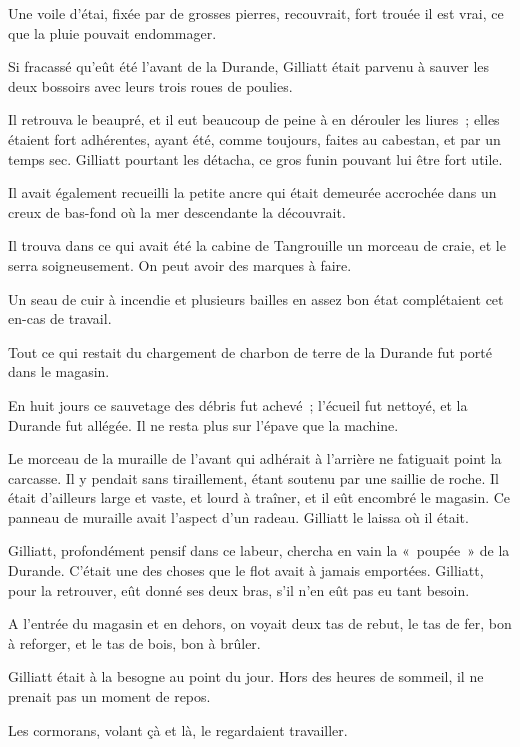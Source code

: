 \documentclass[french,twoside]{book} %
\begin{document}
Une voile d’étai, fixée par de grosses pierres, recouvrait, fort trouée il est vrai, ce que la pluie pouvait endommager.\par
Si fracassé qu’eût été l’avant de la Durande, Gilliatt était parvenu à sauver les deux bossoirs avec leurs trois roues de poulies.\par
Il retrouva le beaupré, et il eut beaucoup de peine à en dérouler les liures ; elles étaient fort adhérentes, ayant été, comme toujours, faites au cabestan, et par un temps sec. Gilliatt pourtant les détacha, ce gros funin pouvant lui être fort utile.\par
Il avait également recueilli la petite ancre qui était demeurée accrochée dans un creux de bas-fond où la mer descendante la découvrait.\par
Il trouva dans ce qui avait été la cabine de  Tangrouille un morceau de craie, et le serra soigneusement. On peut avoir des marques à faire.\par
Un seau de cuir à incendie et plusieurs bailles en assez bon état complétaient cet en-cas de travail.\par
Tout ce qui restait du chargement de charbon de terre de la Durande fut porté dans le magasin.\par
En huit jours ce sauvetage des débris fut achevé ; l’écueil fut nettoyé, et la Durande fut allégée. Il ne resta plus sur l’épave que la machine.\par
Le morceau de la muraille de l’avant qui adhérait à l’arrière ne fatiguait point la carcasse. Il y pendait sans tiraillement, étant soutenu par une saillie de roche. Il était d’ailleurs large et vaste, et lourd à traîner, et il eût encombré le magasin. Ce panneau de muraille avait l’aspect d’un radeau. Gilliatt le laissa où il était.\par
Gilliatt, profondément pensif dans ce labeur, chercha en vain la « poupée » de la Durande. C’était une des choses que le flot avait à jamais emportées. Gilliatt, pour la retrouver, eût donné ses deux bras, s’il n’en eût pas eu tant besoin.\par
A l’entrée du magasin et en dehors, on voyait deux tas de rebut, le tas de fer, bon à reforger, et le tas de bois, bon à brûler.\par
Gilliatt était à la besogne au point du jour. Hors des heures de sommeil, il ne prenait pas un moment de repos.\par
Les cormorans, volant çà et là, le regardaient travailler.
\end{document}
